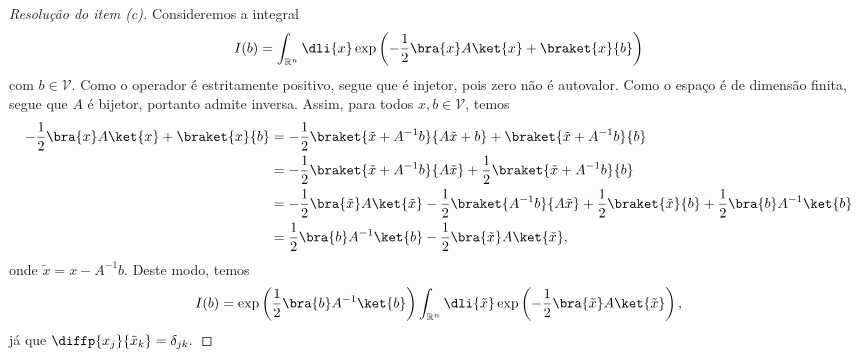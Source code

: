 \begin{proof}[Resolução do item (c)]
    Consideremos a integral
    \begin{equation*}
        I(b) = \int_{\mathbb{R}^n} \dli{x}\exp\left(-\frac12\bra{x}A\ket{x} + \braket{x}{b}\right)
    \end{equation*}
    com \(b \in \mathscr{V}\).
    Como o operador é estritamente positivo, segue que é injetor, pois zero não é autovalor. Como o espaço é de dimensão finita, segue que \(A\) é bijetor, portanto admite inversa. Assim, para todos \(x, b \in \mathscr{V}\), temos
    \begin{align*}
        -\frac12 \bra{x}A\ket{x} + \braket{x}{b} &= - \frac12\braket{\tilde{x} + A^{-1}b}{A\tilde{x} + b} + \braket{\tilde{x} + A^{-1}{b}}{b}\\
                                                 &= - \frac12\braket{\tilde{x} + A^{-1}b}{A\tilde{x}} + \frac12\braket{\tilde{x} + A^{-1} b}{b}\\
                                                 &= - \frac12 \bra{\tilde{x}}A\ket{\tilde{x}} - \frac12 \braket{A^{-1}b}{A\tilde{x}} + \frac12\braket{\tilde{x}}{b} + \frac12\bra{b}A^{-1}\ket{b}\\
                                                 &= \frac12\bra{b}A^{-1}\ket{b} - \frac12 \bra{\tilde{x}}A\ket{\tilde{x}},
    \end{align*}
    onde \(\tilde{x} = x - A^{-1}b\). Deste modo, temos
    \begin{equation*}
        I(b) = \exp\left(\frac12 \bra{b}A^{-1}\ket{b}\right)\int_{\mathbb{R}^n} \dli{\tilde{x}} \exp\left(-\frac12 \bra{\tilde{x}}A\ket{\tilde{x}}\right),
    \end{equation*}
    já que \(\diffp{x_j}{\tilde{x}_k} = \delta_{jk}.\)


\end{proof}
